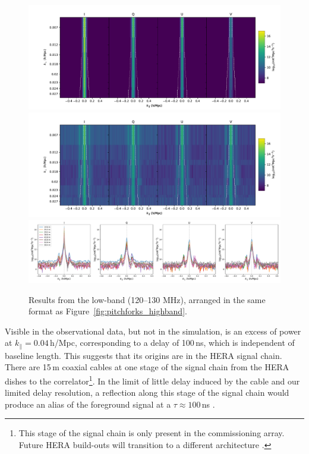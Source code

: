 \documentclass[twocolumn, trackchanges]{aastex61}
\begin{document}
\begin{figure}[h]
\centering
\includegraphics[scale=0.45]{timeavg_SIM_low.pdf}
\includegraphics[scale=0.45]{timeavg_low.pdf}
\includegraphics[scale=0.35]{timeavg_1d_low.pdf}
\caption{Results from the low-band (120--130 MHz), arranged in the same format as Figure~\ref{fig:pitchforks_highband}.}
\label{fig:pitchforks_lowband}
\end{figure}

Visible in the observational data, but not in the simulation, is an excess of power at $k_{\parallel}=0.04$\,h/Mpc, corresponding to a delay of 100\,ns, which is independent of baseline length. This suggests that its origins are in the HERA signal chain. There are 15\,m coaxial cables at one stage of the signal chain from the HERA dishes to the correlator\footnote{This stage of the signal chain is only present in the commissioning array. Future HERA build-outs will transition to a different architecture \citep{deBoer17}.}. In the limit of little delay induced by the cable and our limited delay resolution, a reflection along this stage of the signal chain would produce an alias of the foreground signal at a $\tau \approx 100$\,ns \citep{Beardsley.16, Ewall-Wice.EoX}.
\end{document}
